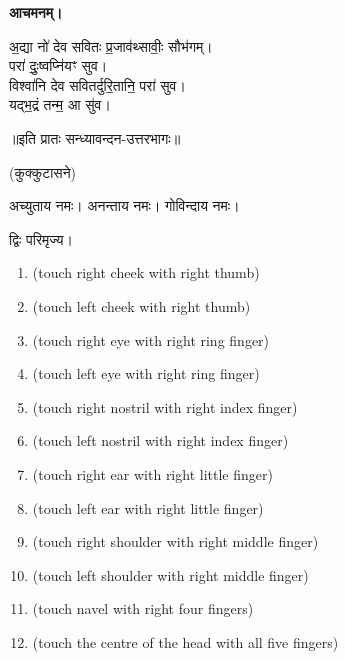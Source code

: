 \textbf{आचमनम्।}


अ॒द्या नो॑ देव सवितः प्र॒जाव॑थ्सावीः॒ सौभ॑गम्।\\
परा॑ दुः॒ष्वप्नि॑यꣳ सुव।\\
विश्वा॑नि देव सवितर्दुरि॒तानि॒ परा॑ सुव।\\
यद्भ॒द्रं तन्म॒ आ सु॑व।

\centerline{॥इति प्रातः सन्ध्यावन्दन-उत्तरभागः॥}


\renewcommand{\sectionmark}[1]{%
\markboth{\large #1 (माध्याह्निकम्)}{}}


(कुक्कुटासने)

अच्युताय नमः। अनन्ताय नमः। गोविन्दाय नमः। 

द्विः परिमृज्य।


\begin{enumerate}
    \item {} {\scriptsize (touch right cheek with right thumb)}
    \item {} {\scriptsize (touch left cheek with right thumb)}
    \item {} {\scriptsize (touch right eye with right ring finger)}
    \item {} {\scriptsize (touch left eye with right ring finger)}
    \item {} {\scriptsize (touch right nostril with right index finger)}
    \item {} {\scriptsize (touch left nostril with right index finger)}
    \item {} {\scriptsize (touch right ear with right little finger)}
    \item {} {\scriptsize (touch left ear with right little finger)}
    \item {} {\scriptsize (touch right shoulder with right middle finger)}
    \item {} {\scriptsize (touch left shoulder with right middle finger)}
    \item {} {\scriptsize (touch navel with right four fingers)}
    \item {} {\scriptsize (touch the centre of the head with all five fingers)}
\end{enumerate}


